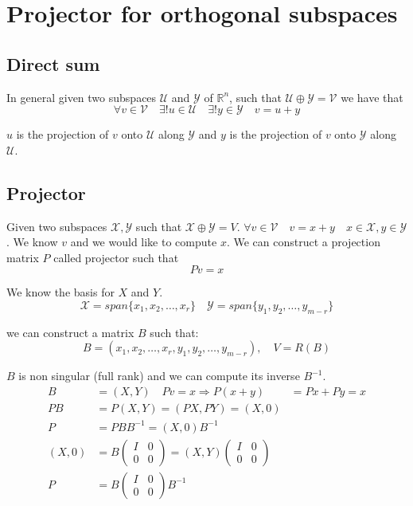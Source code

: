 \chapter{Projector for orthogonal subspaces}

\section{Direct sum}
In general given two subspaces \( \mathcal{U} \) and \( \mathcal{Y} \) of \( \mathbb{R}^n \),
such that \( \mathcal{U} \oplus \mathcal{Y} = \mathcal{V} \) we have that
$$ \forall v \in \mathcal{V} \quad \exists! u \in \mathcal{U} \quad \exists! y \in \mathcal{Y} \quad v = u + y $$

$u$ is the projection of $v$ onto $\mathcal{U}$ along $\mathcal{Y}$ and $y$ is the projection of $v$ onto $\mathcal{Y}$ along $\mathcal{U}$.

\section{Projector}
Given two subspaces $\mathcal{X}, \mathcal{Y}$ such that $\mathcal{X} \oplus \mathcal{Y} =V$.
$ \forall v \in \mathcal{V} \quad v = x + y \quad x \in \mathcal{X}, y \in \mathcal{Y}$.
We know $v$ and we would like to compute $x$. We can construct a projection matrix $P$ called projector such that
$$ Pv = x $$

We know the basis for $X$ and $Y$.
$$ \mathcal{X} = span\{x_1, x_2, \ldots, x_r\} \quad \mathcal{Y} = span\{y_1, y_2, \ldots, y_{m - r}\} $$

we can construct a matrix $B$ such that:
$$ B = (x_1, x_2, \ldots, x_r, y_1, y_2, \ldots, y_{m - r}), \quad V = R(B) $$

$B$ is non singular (full rank) and we can compute its inverse $B^{-1}$.
\[
\begin{aligned}
    B &= (X, Y) \quad Pv = x
    \Rightarrow P(x + y) &= Px + Py = x \\
    PB &= P(X, Y) = (PX, PY) = (X, 0) \\
    P &= PBB^{-1} = (X, 0)B^{-1} \\
    (X, 0) &= B\begin{pmatrix}
        I & 0 \\
        0 & 0
    \end{pmatrix} = (X, Y)\begin{pmatrix}
        I & 0 \\
        0 & 0
    \end{pmatrix} \\
    P &= B\begin{pmatrix}
        I & 0 \\
        0 & 0
    \end{pmatrix}B^{-1}
\end{aligned}
\]

